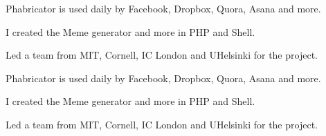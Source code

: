 \documentclass[]{deedy-resume-openfont}
\begin{document}
\begin{minipage}[t]{0.66\textwidth}
\begin{tightemize}
\item Phabricator is used daily by Facebook, Dropbox, Quora, Asana and more.
\item I created the Meme generator and more in PHP and Shell.
\item Led a team from MIT, Cornell, IC London and UHelsinki for the project.
\end{tightemize}
\sectionsep
{}
\begin{tightemize}
\item Phabricator is used daily by Facebook, Dropbox, Quora, Asana and more.
\item I created the Meme generator and more in PHP and Shell.
\item Led a team from MIT, Cornell, IC London and UHelsinki for the project.
\end{tightemize}
\sectionsep

\end{minipage} 
\end{document}
